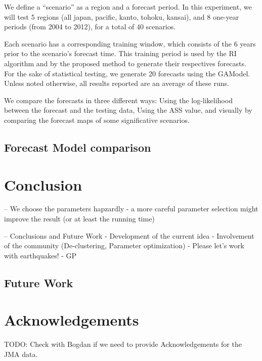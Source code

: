 \documentclass{sig-alternate}
\begin{document}
We define a ``scenario'' as a region and a forecast period. In this
experiment, we will test 5 regions (all japan, pacific, kanto, tohoku,
kansai), and 8 one-year periods (from 2004 to 2012), for a total of 40
scenarios.

Each scenario has a corresponding training window, which consists of
the 6 years prior to the scenario's forecast time. This training
period is used by the RI algorithm and by the proposed method to
generate their respectives forecasts. For the sake of statistical
testing, we generate 20 forecasts using the GAModel. Unless noted
otherwise, all results reported are an average of these runs.

We compare the forecasts in three different ways: Using the
log-likelihood between the forecast and the testing data, Using the
ASS value, and visually by comparing the forecast maps of some
significative scenarios.

\subsection{Forecast Model comparison}





\section{Conclusion}


-- We choose the parameters hapzardly - a more careful parameter
selection might improve the result (or at least the running time)

-- Conclusions and Future Work
   - Development of the current idea
   - Involvement of the community (De-clustering, Parameter optimization)
   - Please let's work with earthquakes!
   - GP
\subsection{Future Work}

\section*{Acknowledgements}

TODO: Check with Bogdan if we need to provide Acknowledgements for the
JMA data.




\end{document}
